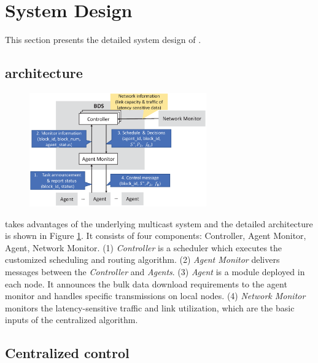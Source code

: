 \section{System Design}
\label{sec:system}

This section presents the detailed system design of \name.%

\subsection{\name architecture}
\label{subsec:system:architecture}

\begin{figure}[t]
  \centering
  \includegraphics[width=3in]{images/implementation_v2.eps}
  \label{fig:implementation}
\vspace{-0.4cm}
\end{figure}

\name takes advantages of the underlying multicast system and the detailed architecture is shown in Figure \ref{fig:implementation}. It consists of four components: Controller, Agent Monitor, Agent, Network Monitor. (1) \emph{Controller} is a scheduler which executes the customized scheduling and routing algorithm. (2) \emph{Agent Monitor} delivers messages between the \emph{Controller} and \emph{Agents}. (3) \emph{Agent} is a module deployed in each node. It announces the bulk data download requirements to the agent monitor and handles specific transmissions on local nodes. (4) \emph{Network Monitor} monitors the latency-sensitive traffic and link utilization, which are the basic inputs of the centralized algorithm.

\subsection{Centralized control}
\label{subsec:system:centralized}

